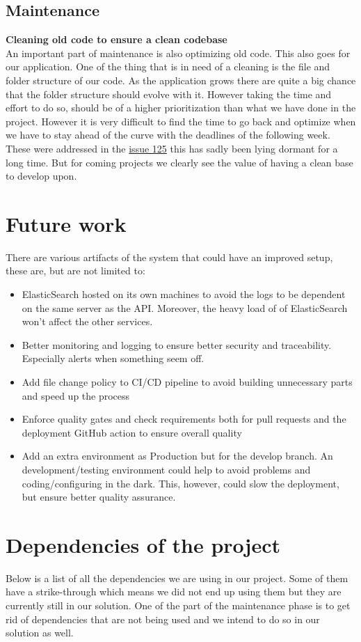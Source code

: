 \documentclass[10pt]{article}
\newcommand{\backmatter}{\clearpage \cfoot{\thepage\ }
\fancyhead{}
\renewcommand{\headrulewidth}{0pt}
\setcounter{page}{1}
\pagenumbering{alph}}
\begin{document}
\subsection{Maintenance}

\textbf{Cleaning old code to ensure a clean codebase}\\
An important part of maintenance is also optimizing old code. This also goes for our application. One of the thing that is in need of a cleaning is the file and folder structure of our code. As the application grows there are quite a big chance that the folder structure should evolve with it. However taking the time and effort to do so, should be of a higher prioritization than what we have done in the project.
However it is very difficult to find the time to go back and optimize when we have to stay ahead of the curve with the deadlines of the following week. 
These were addressed in the  \href{https://github.com/Arklaide/devopsITUproject/issues/125}{issue 125} this has sadly been lying dormant for a long time.
But for coming projects we clearly see the value of having a clean base to develop upon.

\section{Future work}
There are various artifacts of the system that could have an improved setup, these are, but are not limited to:
\begin{itemize}
    \item ElasticSearch hosted on its own machines to avoid the logs to be dependent on the same server as the API. Moreover, the heavy load of of ElasticSearch won't affect the other services.
    \item Better monitoring and logging to ensure better security and traceability. Especially alerts when something seem off.
    \item Add file change policy to CI/CD pipeline to avoid building unnecessary parts and speed up the process
    \item Enforce quality gates and check requirements both for pull requests and the deployment GitHub action to ensure overall quality
    \item Add an extra environment as Production but for the develop branch. An development/testing environment could help to avoid problems and coding/configuring in the dark. This, however, could slow the deployment, but ensure better quality assurance.
\end{itemize}

\label{LastPage}

\backmatter 
\printbibliography

\appendix
\section{Dependencies of the project}
\label{depappendix}
Below is a list of all the dependencies we are using in our project. Some of them have a strike-through which means we did not end up using them but they are currently still in our solution. One of the part of the maintenance phase is to get rid of dependencies that are not being used and we intend to do so in our solution as well.    
\end{document}
